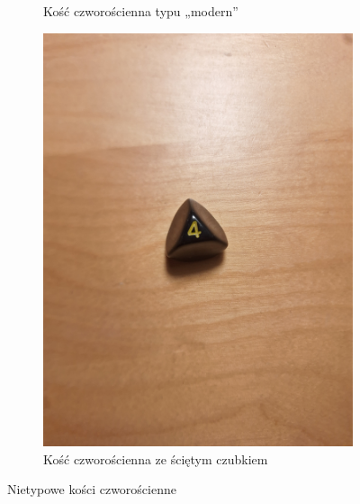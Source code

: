 \begin{figure}[h]
\begin{subfigure}{.45\textwidth}
        \caption{\label{fig:modern_k4}Kość czworościenna typu „modern”}
      \end{subfigure}%
      \begin{subfigure}{.45\textwidth}
        \includegraphics[width=.9\linewidth, trim={250mm 200mm 350mm 150mm}, clip]{chapters/02-teoria/figures/nietypowe_k4}
        \caption{\label{fig:nietypowe_k4}Kość czworościenna ze ściętym czubkiem}
      \end{subfigure}%
    \caption{Nietypowe kości czworościenne}
    \label{fig:nietypowe_modern_k4}
\end{figure}